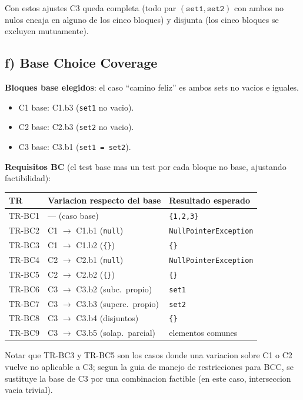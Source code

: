\documentclass[12pt,a4paper]{article}
\begin{document}
Con estos ajustes C3 queda completa (todo par \((\texttt{set1},\texttt{set2})\) con ambos no nulos
encaja en alguno de los cinco bloques) y disjunta (los cinco bloques se excluyen mutuamente).

\subsection{f) Base Choice Coverage}

\textbf{Bloques base elegidos}: el caso ``camino feliz'' es ambos sets no vacios e iguales.
\begin{itemize}
  \item C1 base: C1.b3 (\texttt{set1} no vacio).
  \item C2 base: C2.b3 (\texttt{set2} no vacio).
  \item C3 base: C3.b1 (\texttt{set1 = set2}).
\end{itemize}

\textbf{Requisitos BC} (el test base mas un test por cada bloque no base, ajustando
factibilidad):

\begin{longtable}{@{}p{2cm}p{6cm}p{6.5cm}@{}}
\toprule
\textbf{TR} & \textbf{Variacion respecto del base} & \textbf{Resultado esperado} \\
\midrule
\endhead
TR-BC1 & --- (caso base) & \texttt{\{1,2,3\}} \\
TR-BC2 & C1 $\rightarrow$ C1.b1 (\texttt{null}) & \texttt{NullPointerException} \\
TR-BC3 & C1 $\rightarrow$ C1.b2 (\texttt{\{\}}) & \texttt{\{\}} \\
TR-BC4 & C2 $\rightarrow$ C2.b1 (\texttt{null}) & \texttt{NullPointerException} \\
TR-BC5 & C2 $\rightarrow$ C2.b2 (\texttt{\{\}}) & \texttt{\{\}} \\
TR-BC6 & C3 $\rightarrow$ C3.b2 (subc.\ propio) & \texttt{set1} \\
TR-BC7 & C3 $\rightarrow$ C3.b3 (superc.\ propio) & \texttt{set2} \\
TR-BC8 & C3 $\rightarrow$ C3.b4 (disjuntos) & \texttt{\{\}} \\
TR-BC9 & C3 $\rightarrow$ C3.b5 (solap.\ parcial) & elementos comunes \\
\bottomrule
\end{longtable}

\noindent Notar que TR-BC3 y TR-BC5 son los casos donde una variacion sobre C1 o C2 vuelve no
aplicable a C3; segun la guia de manejo de restricciones para BCC, se sustituye la base de C3 por
una combinacion factible (en este caso, interseccion vacia trivial).
\end{document}

